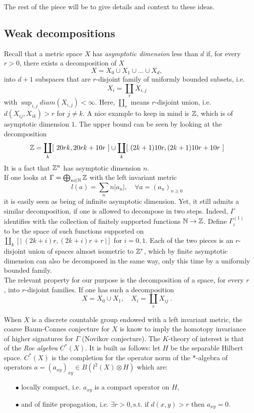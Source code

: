 The rest of the piece will be to give details and context to these ideas.

\subsection{Weak decompositions}

Recall that a metric space $X$ has \textit{asymptotic dimension} less than $d$ if, for every $r>0$, there exists a decomposition of $X$
\[X = X_0 \cup X_1 \cup ... \cup X_d,\]
into $d+1$ subspaces that are $r$-disjoint family of uniformly bounded subsets, i.e. \[X_i = \coprod_r X_{i,j}\] with $\sup_{i,j} diam(X_{i,j})<\infty$. Here, $\coprod_r$ means $r$-disjoint union, i.e. $d(X_{ij},X_{ik})>r$ for $j\neq k$. A nice example to keep in mind is $\mathbb{Z}$, which is of asymptotic dimension $1$. The upper bound can be seen by looking at the decomposition 
\[ \mathbb{Z} = \coprod_k [ \ 20rk, 20rk+10r \ ] \cup \coprod_k [ \  (2k+1)10r , (2k+1)10r+10r \ ] \] It is a fact that $\mathbb{Z}^n$ has asymptotic dimension $n$. \\

If one looks at $\Gamma=\bigoplus_{n\in \mathbb{N}} \mathbb{Z}$ with the left invariant metric 
\[ l(a)= \sum_n n|a_n|, \quad \forall a = (a_n)_{n \geq 0}\] it is easily seen as being of infinite asymptotic dimension. Yet, it still admits a similar decomposition, if one is allowed to decompose in two steps. Indeed, $\Gamma$ identifies with the collection of finitely supported functions $\mathbb{N} \rightarrow \mathbb{Z}$. Define $\Gamma_i^{(1)}$ to be the space of such functions supported on $\coprod_k [| \ (2k+i)r, (2k+i)r+r \ |]$ for $i=0,1$. Each of the two pieces is an $r$-disjoint union of spaces almost isometric to $\mathbb{Z}^r$, which by finite asymptotic dimension can also be decomposed in the same way, only this time by a uniformly bounded family.\\ 

The relevant property for our purpose is the decomposition of a space, for every $r$, into $r$-disjoint families. If one has such a decomposition
\[X = X_0 \cup X_1 , \quad X_i = \coprod_r X_{ij} \ .\]

When $X$ is a discrete countable group endowed with a left invariant metric, the coarse Baum-Connes conjecture for $X$ is know to imply the homotopy invariance of higher signatures for $\Gamma$ (Novikov conjecture). The $K$-theory of interest is that of the \textit{Roe algebra} $C^*(X)$. It is built as follows: let $H$ be the separable Hilbert space. $C^*(X)$ is the completion for the operator norm of the $*$-algebra of operators $a =(a_{xy})_{xy}\in B(l^2(X)\otimes H)$ which are:
\begin{itemize}
\item[$\bullet$] locally compact, i.e. $a_{xy}$ is a compact operator on $H$,
\item[$\bullet$] and of finite propagation, i.e. $\exists r> 0, \text{s.t. if } d(x,y)> r$ then $a_{xy}=0$.
\end{itemize}

